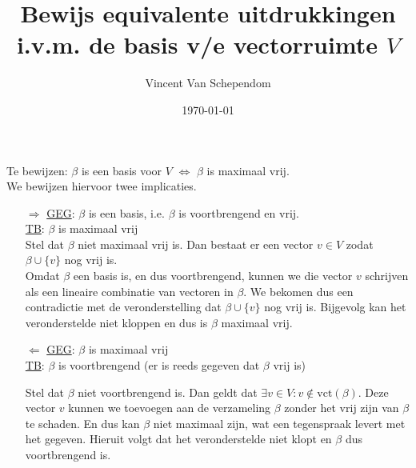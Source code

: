 \documentclass{article}
\title{Bewijs equivalente uitdrukkingen i.v.m. de basis v/e vectorruimte \(V\)}
\author{Vincent Van Schependom}
\date{\today}
\begin{document}
	\maketitle
	
	Te bewijzen: \(\beta\) is een basis voor \(V\) \(\Leftrightarrow\) \(\beta\) is maximaal vrij.\\
	We bewijzen hiervoor twee implicaties.\\
	
	\begin{itemize}
		
		\item[\(\Rightarrow\)]\underline{GEG}: \(\beta\) is een basis, i.e. \(\beta\) is voortbrengend en vrij.\\
		\underline{TB}: \(\beta\) is maximaal vrij\\
		
		Stel dat \(\beta\) niet maximaal vrij is. Dan bestaat er een vector \(v \in V\) zodat \(\beta \cup \{v\}\) nog vrij is.\\
		Omdat \(\beta\) een basis is, en dus voortbrengend, kunnen we die vector \(v\) schrijven als een lineaire combinatie van vectoren in \(\beta\). We bekomen dus een contradictie met de veronderstelling dat \(\beta \cup \{v\}\) nog vrij is. Bijgevolg kan het veronderstelde niet kloppen en dus is \(\beta\) maximaal vrij. \\
		
		\item[\(\Leftarrow\)]\underline{GEG}: \(\beta\) is maximaal vrij\\
		\underline{TB}: \(\beta\) is voortbrengend (er is reeds gegeven dat \(\beta\) vrij is)
		
		Stel dat \(\beta\) niet voortbrengend is. Dan geldt dat \(\exists v \in V: v \notin \text{vct}(\beta)\). Deze vector \(v\) kunnen we toevoegen aan de verzameling \(\beta\) zonder het vrij zijn van \(\beta\) te schaden. En dus kan \(\beta\) niet maximaal zijn, wat een tegenspraak levert met het gegeven. Hieruit volgt dat het veronderstelde niet klopt en \(\beta\) dus voortbrengend is.
		
	\end{itemize}	
	
\end{document}
